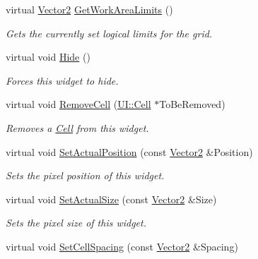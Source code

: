 \begin{DoxyCompactItemize}
virtual \hyperlink{classphys_1_1Vector2}{Vector2} \hyperlink{classphys_1_1UI_1_1CellGrid_a328392c90b93da93354756607e328e0c}{GetWorkAreaLimits} ()
\begin{DoxyCompactList}\small\item\em Gets the currently set logical limits for the grid. \item\end{DoxyCompactList}\item 
\hypertarget{classphys_1_1UI_1_1CellGrid_a8f1ea23b55724f3346a6c32c87f4eabc}{
virtual void \hyperlink{classphys_1_1UI_1_1CellGrid_a8f1ea23b55724f3346a6c32c87f4eabc}{Hide} ()}
\label{classphys_1_1UI_1_1CellGrid_a8f1ea23b55724f3346a6c32c87f4eabc}

\begin{DoxyCompactList}\small\item\em Forces this widget to hide. \item\end{DoxyCompactList}\item 
virtual void \hyperlink{classphys_1_1UI_1_1CellGrid_af7ff6b201aa24939c82ee34e96e67a32}{RemoveCell} (\hyperlink{classphys_1_1UI_1_1Cell}{UI::Cell} $\ast$ToBeRemoved)
\begin{DoxyCompactList}\small\item\em Removes a \hyperlink{classphys_1_1UI_1_1Cell}{Cell} from this widget. \item\end{DoxyCompactList}\item 
virtual void \hyperlink{classphys_1_1UI_1_1CellGrid_a911ce43c124ca7ac9f02ba7d8e08d919}{SetActualPosition} (const \hyperlink{classphys_1_1Vector2}{Vector2} \&Position)
\begin{DoxyCompactList}\small\item\em Sets the pixel position of this widget. \item\end{DoxyCompactList}\item 
virtual void \hyperlink{classphys_1_1UI_1_1CellGrid_a86a0ff7a5a916278d901bae05df01847}{SetActualSize} (const \hyperlink{classphys_1_1Vector2}{Vector2} \&Size)
\begin{DoxyCompactList}\small\item\em Sets the pixel size of this widget. \item\end{DoxyCompactList}\item 
virtual void \hyperlink{classphys_1_1UI_1_1CellGrid_ac62bf02320f381012d22941d07ae62a2}{SetCellSpacing} (const \hyperlink{classphys_1_1Vector2}{Vector2} \&Spacing)

\end{DoxyCompactItemize}
